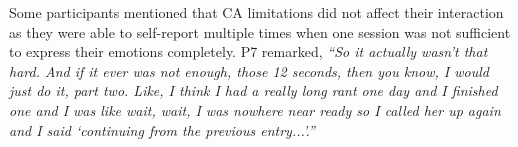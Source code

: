         
        Some participants mentioned that \ac{CA} limitations did not affect their interaction as they were able to self-report multiple times when one session was not sufficient to express their emotions completely.
        P7 remarked,
                \textit{
                ``So it actually wasn't that hard. And if it ever was not enough, those 12 seconds, then you know, I would just do it, part two. Like, I think I had a really long rant one day and I finished one and I was like wait, wait, I was nowhere near ready so I called her up again and I said `continuing from the previous entry...'.''
                }
            
